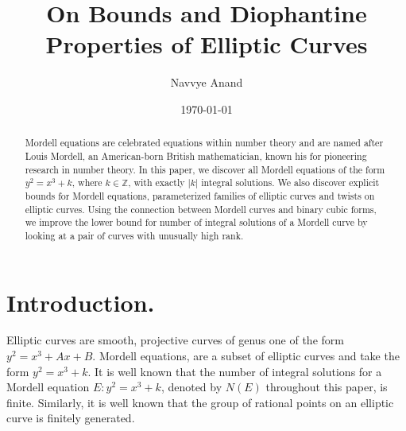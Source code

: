 \documentclass[12pt]{amsart}
\theoremstyle{plain}
\theoremstyle{definition}
\theoremstyle{remark}
\numberwithin{equation}{section}
\numberwithin{thm}{section}
\theoremstyle{named}
\theoremstyle{named}
\begin{document}
\title{On Bounds and Diophantine Properties of Elliptic Curves}
\author{Navvye Anand}
\address{Euler Circle, Mountain View, CA 94040}

\date{\today}

\begin{abstract}
Mordell equations are celebrated equations within number theory and are named after Louis Mordell, an American-born British mathematician, known his for pioneering research in number theory. In this paper, we discover all Mordell equations of the form $y^2 = x^3 + k$, where $k \in \mathbb Z$, with exactly $|k|$ integral solutions. We also discover explicit bounds for Mordell equations, parameterized families of elliptic curves and twists on elliptic curves. Using the connection between Mordell curves and binary cubic forms, we improve the lower bound for number of integral solutions of a Mordell curve by looking at a pair of curves with unusually high rank. 
\end{abstract}
\maketitle
\section{Introduction.} Elliptic curves are smooth, projective curves of genus one of the form $y^2 = x^3 + Ax + B$. Mordell equations, are a subset of elliptic curves and take the form $y^2 = x^3 + k$. It is well known that the number of integral solutions for a Mordell equation $E: y^2 = x^3 + k$, denoted by $N(E)$ throughout this paper, is finite. Similarly, it is well known that the group of rational points on an elliptic curve is finitely generated. %
\end{document}
